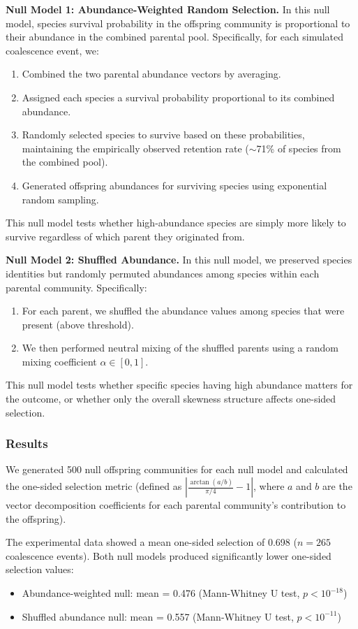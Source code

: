 \textbf{Null Model 1: Abundance-Weighted Random Selection.}
In this null model, species survival probability in the offspring community is proportional to their abundance in the combined parental pool. Specifically, for each simulated coalescence event, we:
\begin{enumerate}
    \item Combined the two parental abundance vectors by averaging.
    \item Assigned each species a survival probability proportional to its combined abundance.
    \item Randomly selected species to survive based on these probabilities, maintaining the empirically observed retention rate ($\sim$71\% of species from the combined pool).
    \item Generated offspring abundances for surviving species using exponential random sampling.
\end{enumerate}
This null model tests whether high-abundance species are simply more likely to survive regardless of which parent they originated from.

\textbf{Null Model 2: Shuffled Abundance.}
In this null model, we preserved species identities but randomly permuted abundances among species within each parental community. Specifically:
\begin{enumerate}
    \item For each parent, we shuffled the abundance values among species that were present (above threshold).
    \item We then performed neutral mixing of the shuffled parents using a random mixing coefficient $\alpha \in [0,1]$.
\end{enumerate}
This null model tests whether specific species having high abundance matters for the outcome, or whether only the overall skewness structure affects one-sided selection.

\subsubsection*{Results}

We generated 500 null offspring communities for each null model and calculated the one-sided selection metric (defined as $\left|\frac{\arctan(a/b)}{\pi/4} - 1\right|$, where $a$ and $b$ are the vector decomposition coefficients for each parental community's contribution to the offspring).

The experimental data showed a mean one-sided selection of 0.698 ($n = 265$ coalescence events). Both null models produced significantly lower one-sided selection values:
\begin{itemize}
    \item Abundance-weighted null: mean = 0.476 (Mann-Whitney U test, $p < 10^{-18}$)
    \item Shuffled abundance null: mean = 0.557 (Mann-Whitney U test, $p < 10^{-11}$)
\end{itemize}

